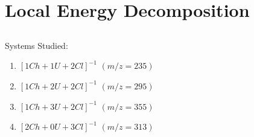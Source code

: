 \section{Local Energy Decomposition}
\label{sec:led_analysis}
\subsection{}
Systems Studied:
\begin{enumerate}
    \item $[1Ch+1U+2Cl]^{-1}$ $(m/z = 235)$
    \item $[1Ch+2U+2Cl]^{-1}$ $(m/z = 295)$
    \item $[1Ch+3U+2Cl]^{-1}$ $(m/z = 355)$
    \item $[2Ch+0U+3Cl]^{-1}$ $(m/z = 313)$
\end{enumerate}